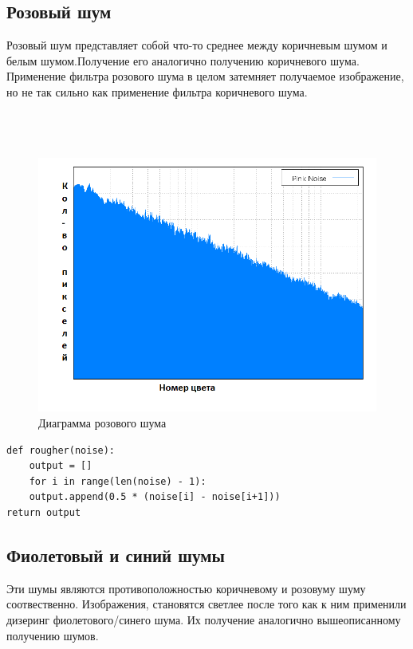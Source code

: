 \subsection{Розовый шум}
Розовый шум представляет собой что-то среднее между коричневым шумом и белым шумом.Получение его аналогично получению коричневого шума.
Применение фильтра розового шума в целом затемняет получаемое изображение, но не так сильно как применение фильтра коричневого шума.
\\\\\\\\
\begin{figure}[h!]
	\centering
	\includegraphics[width=\textwidth]{img/7_pink_noise.png}
	\caption{Диаграмма розового шума}
	\label{fig:spire02}
\end{figure}
\begin{lstlisting}[style=pseudocode,caption={Получение розового шума}]
def rougher(noise):
    output = []
    for i in range(len(noise) - 1):
    output.append(0.5 * (noise[i] - noise[i+1]))
return output
\end{lstlisting}

\subsection{Фиолетовый и синий шумы}
Эти шумы являются противоположностью коричневому и розовуму шуму соотвественно. Изображения, становятся светлее после того как к ним применили дизеринг фиолетового/синего шума. Их получение аналогично вышеописанному получению шумов.

